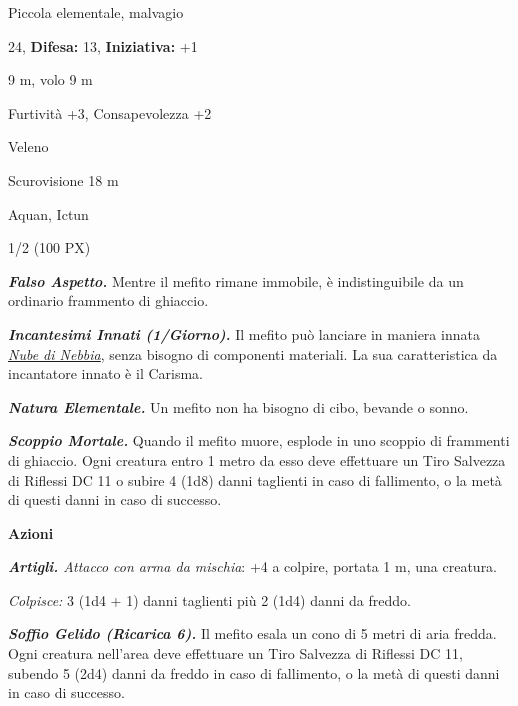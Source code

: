 \begin{multicols}{2}
{
\noindent
\begin{description}[noitemsep, topsep=0pt, parsep=0pt, partopsep=0pt, leftmargin=0cm, labelwidth=2.2cm]
	\item[\textbf{Taglia/Tipo:}] Piccola elementale, malvagio
	\item[\textbf{Caratt.:}] 
	\item[\textbf{Punti Ferita:}] 24,  \textbf{Difesa:} 13,  \textbf{Iniziativa:} +1
	\item[\textbf{Movimento:}] 9 m, volo 9 m
	\item[\textbf{Tiri Salvez.:}] 
	\item[\textbf{Comp.:}] Furtività +3, Consapevolezza +2
	\item[\textbf{Imm. Danni:}] Veleno
	\item[\textbf{Sensi:}] Scurovisione 18 m
	\item[\textbf{Linguaggi:}] Aquan, Ictun
	\item[\textbf{Sfida:}] 1/2 (100 PX)\smallskip
\end{description}

\emph{\textbf{Falso Aspetto.}} Mentre il mefito rimane immobile, è indistinguibile da un ordinario frammento di ghiaccio.

\emph{\textbf{Incantesimi Innati (1/Giorno).}} Il mefito può lanciare in maniera innata \emph{\hyperlink{Nube di Nebbia}{Nube di Nebbia}}, senza bisogno di componenti materiali. La sua caratteristica da incantatore innato è il Carisma.

\emph{\textbf{Natura Elementale.}} Un mefito non ha bisogno di cibo, bevande o sonno.

\emph{\textbf{Scoppio Mortale.}} Quando il mefito muore, esplode in uno scoppio di frammenti di ghiaccio. Ogni creatura entro 1 metro da esso deve effettuare un Tiro Salvezza di Riflessi DC 11 o subire 4 (1d8) danni taglienti in caso di fallimento, o la metà di questi danni in caso
di successo.

\textbf{Azioni}

\emph{\textbf{Artigli.} Attacco con arma da mischia}: +4 a colpire, portata 1 m, una creatura.

\emph{Colpisce:} 3 (1d4 + 1) danni taglienti più 2 (1d4) danni da freddo.

\emph{\textbf{Soffio Gelido (Ricarica 6).}} Il mefito esala un cono di 5 metri di aria fredda. Ogni creatura nell'area deve effettuare un Tiro Salvezza di Riflessi DC 11, subendo 5 (2d4) danni da freddo in caso di fallimento, o la metà di questi danni in caso di successo.

}
\end{multicols}
